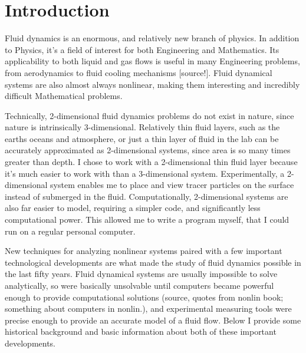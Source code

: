 		

      \chapter*{Introduction}

	
	Fluid dynamics is an enormous, and relatively new branch of physics.  In addition to Physics, it's a field of interest for both Engineering and Mathematics.  Its applicability to both liquid and gas flows is useful in many Engineering problems, from aerodynamics to fluid cooling mechanisms [source!].  Fluid dynamical systems are also almost always nonlinear, making them interesting and incredibly difficult Mathematical problems.

	Technically, 2-dimensional fluid dynamics problems do not exist in nature, since nature is intrinsically 3-dimensional.  Relatively thin fluid layers, such as the earths oceans and atmosphere, or just a thin layer of fluid in the lab can be accurately approximated as 2-dimensional systems, since area is so many times greater than depth.  I chose to work with a 2-dimensional thin fluid layer because it's much easier to work with than a 3-dimensional system.  Experimentally, a 2-dimensional system enables me to place and view tracer particles on the surface instead of submerged in the fluid.  Computationally, 2-dimensional systems are also far easier to model, requiring a simpler code, and  significantly less computational power.  This allowed me to write a program myself, that I could run on a regular personal computer.

	New techniques for analyzing nonlinear systems paired with a few important technological developments are what made the study of fluid dynamics possible in the last fifty years.  Fluid dynamical systems are usually impossible to solve analytically, so were basically unsolvable until computers became powerful enough to provide computational solutions (source, quotes from nonlin book; something about computers in nonlin.), and experimental measuring tools were precise enough to provide an accurate model of a fluid flow.  Below I provide some historical background and basic information about both of these important developments.

